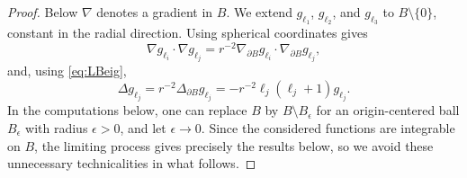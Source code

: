 \documentclass[10pt,a4paper]{amsart}
\begin{document}
\begin{proof}
    Below $\nabla$ denotes a gradient in $B$. We extend $g_{\ell_1}$, $g_{\ell_2}$, and $g_{\ell_3}$ to $B\setminus\{0\}$, constant in the radial direction. Using spherical coordinates gives
    \begin{equation} \label{eq:gip}
        \nabla g_{\ell_i}\cdot\nabla g_{\ell_j} = r^{-2}\nabla_{\partial B} g_{\ell_i}\cdot \nabla_{\partial B} g_{\ell_j},
    \end{equation}
    and, using \eqref{eq:LBeig},
    \begin{equation} \label{eq:deltag}
        \Delta g_{\ell_j} = r^{-2} \Delta_{\partial B} g_{\ell_j} = -r^{-2}\ell_j (\ell_j + 1) g_{\ell_j}.
    \end{equation}
    In the computations below, one can replace $B$ by $B\setminus B_\epsilon$ for an origin-centered ball $B_\epsilon$ with radius $\epsilon>0$, and let $\epsilon\to 0$. Since the considered functions are integrable on $B$, the limiting process gives precisely the results below, so we avoid these unnecessary technicalities in what follows. 
    	

\end{proof}
\end{document}
